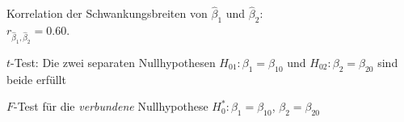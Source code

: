 \documentclass[a4paper]{foils}
\begin{document}
\begin{landscape}
\begin{center}
\parbox{1.05\textwidth}{

\vspace{-1em}

\hspace{0.15\textwidth}
\parbox{0.8\textwidth}{{\small
Korrelation der Schwankungsbreiten von  $\hat{\beta}_1$ und 
$\hat{\beta}_2$:\\
 $r_{\hat{\beta}_1,\hat{\beta}_2}=0.60$.
}}}
\hspace{0em}
\parbox{0.30\textwidth}{
{\small
\bi
\item 
$t$-Test: Die zwei separaten Nullhypothesen $H_{01}: \beta_1=\beta_{10}$ 
und $H_{02}: \beta_2=\beta_{20}$ sind beide erf\"ullt \\[0em]
\item
$F$-Test f\"ur die \emph{verbundene} Nullhypothese 
$H^*_0: \beta_1=\beta_{10}$, 
$\beta_2=\beta_{20}$
\ei
}
}



\end{center}
\end{landscape}
\end{document}
